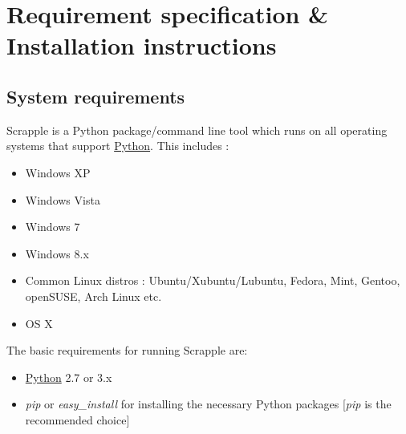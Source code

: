 \documentclass[letterpaper,12pt,english]{sphinxmanual}
\begin{document}
\chapter{Requirement specification \& Installation instructions}
\label{index:requirement-specification-installation-instructions}

\section{System requirements}
\label{intro/requirements:intro-requirements}\label{intro/requirements::doc}\label{intro/requirements:system-requirements}
Scrapple is a Python package/command line tool which runs on all operating systems that support \href{https://www.python.org/}{Python}. This includes :
\begin{itemize}
\item {} 
Windows XP

\item {} 
Windows Vista

\item {} 
Windows 7

\item {} 
Windows 8.x

\item {} 
Common Linux distros : Ubuntu/Xubuntu/Lubuntu, Fedora, Mint, Gentoo, openSUSE, Arch Linux etc.

\item {} 
OS X

\end{itemize}

The basic requirements for running Scrapple are:
\begin{itemize}
\item {} 
\href{https://www.python.org/}{Python} 2.7 or 3.x

\item {} 
\emph{pip} or \emph{easy\_install} for installing the necessary Python packages {[}\emph{pip} is the recommended choice{]}

\end{itemize}
\end{document}
